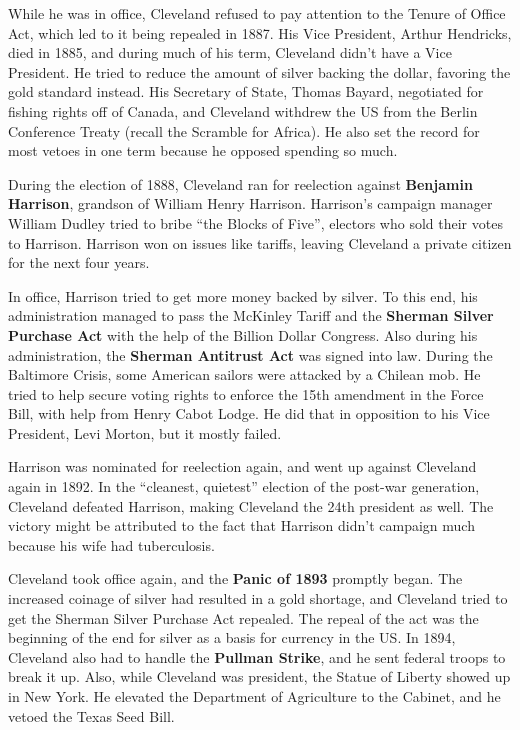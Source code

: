 While he was in office, Cleveland refused to pay attention to the Tenure of Office Act,
which led to it being repealed in 1887.
His Vice President, Arthur Hendricks, died in 1885,
and during much of his term, Cleveland didn't have a Vice President.
He tried to reduce the amount of silver backing the dollar, favoring the gold standard instead.
His Secretary of State, Thomas Bayard, negotiated for fishing rights off of Canada,
and Cleveland withdrew the US from the Berlin Conference Treaty (recall the Scramble for Africa).
He also set the record for most vetoes in one term because he opposed spending so much.

During the election of 1888, Cleveland ran for reelection against \textbf{Benjamin Harrison},
grandson of William Henry Harrison.
Harrison's campaign manager William Dudley tried to bribe ``the Blocks of Five'',
electors who sold their votes to Harrison.
Harrison won on issues like tariffs, leaving Cleveland a private citizen for the next four years.

In office, Harrison tried to get more money backed by silver.
To this end, his administration managed to pass the McKinley Tariff and the \textbf{Sherman Silver Purchase Act}
with the help of the Billion Dollar Congress.
Also during his administration, the \textbf{Sherman Antitrust Act} was signed into law.
During the Baltimore Crisis, some American sailors were attacked by a Chilean mob.
He tried to help secure voting rights to enforce the 15th amendment in the Force Bill,
with help from Henry Cabot Lodge.
He did that in opposition to his Vice President, Levi Morton, but it mostly failed.

Harrison was nominated for reelection again, and went up against Cleveland again in 1892.
In the ``cleanest, quietest'' election of the post-war generation,
Cleveland defeated Harrison, making Cleveland the 24th president as well.
The victory might be attributed to the fact that Harrison didn't campaign much because his wife had tuberculosis.

Cleveland took office again, and the \textbf{Panic of 1893} promptly began.
The increased coinage of silver had resulted in a gold shortage,
and Cleveland tried to get the Sherman Silver Purchase Act repealed.
The repeal of the act was the beginning of the end for silver as a basis for currency in the US\@.
In 1894, Cleveland also had to handle the \textbf{Pullman Strike},
and he sent federal troops to break it up.
Also, while Cleveland was president, the Statue of Liberty showed up in New York.
He elevated the Department of Agriculture to the Cabinet, and he vetoed the Texas Seed Bill.

